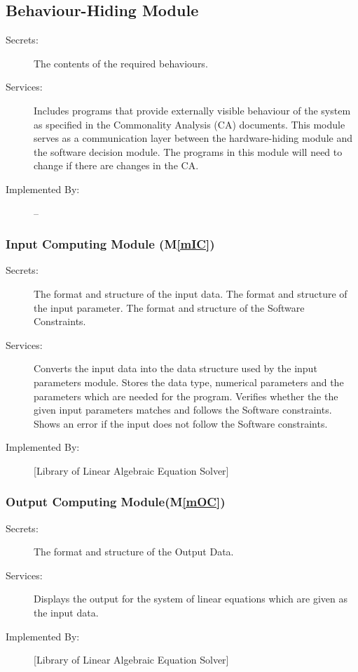 \documentclass[12pt, titlepage]{article}
\newcommand{\mref}[1]{M\ref{#1}}
\begin{document}
\subsection{Behaviour-Hiding Module}

\begin{description}
\item[Secrets:]The contents of the required behaviours.
\item[Services:]Includes programs that provide externally visible behaviour of
  the system as specified in the Commonality Analysis (CA)
  documents. This module serves as a communication layer between the
  hardware-hiding module and the software decision module. The programs in this
  module will need to change if there are changes in the CA.
\item[Implemented By:] --
\end{description}

\subsubsection{Input Computing Module (\mref{mIC})}

\begin{description}
\item[Secrets:]The format and structure of the input data. The format and structure of the input parameter. The format and structure of the Software Constraints.
\item[Services:]Converts the input data into the data structure used by the
  input parameters module. Stores the data type, numerical parameters and the parameters which are needed for the program. Verifies whether the the given input parameters matches and follows the Software constraints. Shows an error if the input does not follow the Software constraints.
\item[Implemented By:] [Library of Linear Algebraic Equation Solver]
\end{description}



\subsubsection{Output Computing Module(\mref{mOC})}

\begin{description}
\item[Secrets:]The format and structure of the Output Data.
\item[Services:]Displays the output for the system of linear equations which are given as the input data.
\item[Implemented By:] [Library of Linear Algebraic Equation Solver]
\end{description}
\end{document}
